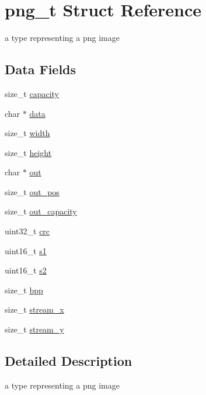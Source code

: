 \hypertarget{structpng__t}{}\section{png\+\_\+t Struct Reference}
\label{structpng__t}


a type representing a png image  


\subsection*{Data Fields}
\begin{DoxyCompactItemize}
\item 
size\+\_\+t \hyperlink{structpng__t_ad721fc6ca6a3d6ba3bc506576622aab0}{capacity}
\item 
char $\ast$ \hyperlink{structpng__t_a91a70b77df95bd8b0830b49a094c2acb}{data}
\item 
size\+\_\+t \hyperlink{structpng__t_a02bed8590a9ddf520e58a060059518ec}{width}
\item 
size\+\_\+t \hyperlink{structpng__t_a02afeaaf8574e7a78d6b466ff2695052}{height}
\item 
char $\ast$ \hyperlink{structpng__t_a392d7ef877b6258e64850ce3a2647dae}{out}
\item 
size\+\_\+t \hyperlink{structpng__t_ac8ef22a87f97ef02768e0faedea1307d}{out\+\_\+pos}
\item 
size\+\_\+t \hyperlink{structpng__t_ac8fcf2b31db62e2bfeb7c2ee10b39908}{out\+\_\+capacity}
\item 
uint32\+\_\+t \hyperlink{structpng__t_a85b7a7f21b6108b69872839e2509cd67}{crc}
\item 
uint16\+\_\+t \hyperlink{structpng__t_a90256a2c1ea2d035ef0a2b87e543bcb8}{s1}
\item 
uint16\+\_\+t \hyperlink{structpng__t_a95ac0a163ca4077eac153ae972bfae9f}{s2}
\item 
size\+\_\+t \hyperlink{structpng__t_a1b190a6d9d3ec163d1a9547740e5d6eb}{bpp}
\item 
size\+\_\+t \hyperlink{structpng__t_aac2e70794d77a569d02e9db38669f145}{stream\+\_\+x}
\item 
size\+\_\+t \hyperlink{structpng__t_a7b8b9225ada455d197dee07a4a25b910}{stream\+\_\+y}
\end{DoxyCompactItemize}


\subsection{Detailed Description}
a type representing a png image 

